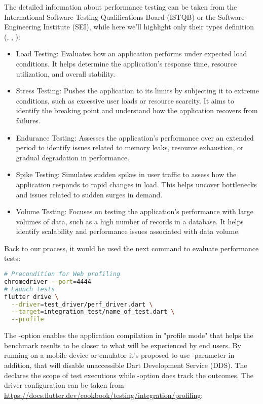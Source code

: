 The detailed information about performance testing can be taken from the International Software Testing Qualifications 
Board (ISTQB) or the Software Engineering Institute (SEI), while here we'll highlight only their types definition 
(\cite{Ian15}, \cite{Sag16}, \cite{Sag23}):
\begin{itemize}
  \item Load Testing: Evaluates how an application performs under expected load conditions. It helps determine the 
  application's response time, resource utilization, and overall stability.

  \item Stress Testing: Pushes the application to its limits by subjecting it to extreme conditions, such as excessive 
  user loads or resource scarcity. It aims to identify the breaking point and understand how the application recovers 
  from failures.

  \item Endurance Testing: Assesses the application's performance over an extended period to identify issues related to 
  memory leaks, resource exhaustion, or gradual degradation in performance.

  \item Spike Testing: Simulates sudden spikes in user traffic to assess how the application responds to rapid changes
  in load. This helps uncover bottlenecks and issues related to sudden surges in demand.

  \item Volume Testing: Focuses on testing the application's performance with large volumes of data, such as a high 
  number of records in a database. It helps identify scalability and performance issues associated with data volume.
\end{itemize}

\noindent Back to our process, it would be used the next command to evaluate performance tests:

\begin{lstlisting}[language=bash]
# Precondition for Web profiling
chromedriver --port=4444
# Launch tests
flutter drive \
  --driver=test_driver/perf_driver.dart \
  --target=integration_test/name_of_test.dart \
  --profile
\end{lstlisting}

The -option enables the application compilation in "profile mode" that helps the benchmark results to be
closer to what will be experienced by end users. By running on a mobile device or emulator it's proposed to use 
-parameter in addition, that will disable unaccessible Dart Development Service (DDS). The  
declares the scope of test executions while \q{--driver}-option does track the outcomes. The driver configuration can be
taken from \href{https://docs.flutter.dev/cookbook/testing/integration/profiling}{https://docs.flutter.dev/cookbook/testing/integration/profiling}:

